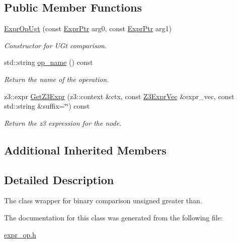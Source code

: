 \subsection*{Public Member Functions}
\begin{DoxyCompactItemize}
\item 
\mbox{\label{classilang_1_1_expr_op_ugt_a548781fafbeafbaf9cae17b931c8c552}} 
\mbox{\hyperlink{classilang_1_1_expr_op_ugt_a548781fafbeafbaf9cae17b931c8c552}{Expr\+Op\+Ugt}} (const \mbox{\hyperlink{classilang_1_1_expr_a85952b6a34620c4c8cab6bac9c9fdf8c}{Expr\+Ptr}} arg0, const \mbox{\hyperlink{classilang_1_1_expr_a85952b6a34620c4c8cab6bac9c9fdf8c}{Expr\+Ptr}} arg1)
\begin{DoxyCompactList}\small\item\em Constructor for U\+Gt comparison. \end{DoxyCompactList}\item 
\mbox{\label{classilang_1_1_expr_op_ugt_a7954930a8864cdbabbf9de2e2680e158}} 
std\+::string \mbox{\hyperlink{classilang_1_1_expr_op_ugt_a7954930a8864cdbabbf9de2e2680e158}{op\+\_\+name}} () const
\begin{DoxyCompactList}\small\item\em Return the name of the operation. \end{DoxyCompactList}\item 
\mbox{\label{classilang_1_1_expr_op_ugt_a77b2393c1f1e9d4f0adba8cf62bc57cd}} 
z3\+::expr \mbox{\hyperlink{classilang_1_1_expr_op_ugt_a77b2393c1f1e9d4f0adba8cf62bc57cd}{Get\+Z3\+Expr}} (z3\+::context \&ctx, const \mbox{\hyperlink{namespaceilang_adc4eee919aa24fff882d03a48d733c19}{Z3\+Expr\+Vec}} \&expr\+\_\+vec, const std\+::string \&suffix=\char`\"{}\char`\"{}) const
\begin{DoxyCompactList}\small\item\em Return the z3 expression for the node. \end{DoxyCompactList}\end{DoxyCompactItemize}
\subsection*{Additional Inherited Members}


\subsection{Detailed Description}
The class wrapper for binary comparison unsigned greater than. 

The documentation for this class was generated from the following file\+:\begin{DoxyCompactItemize}
\item 
\mbox{\hyperlink{expr__op_8h}{expr\+\_\+op.\+h}}\end{DoxyCompactItemize}
